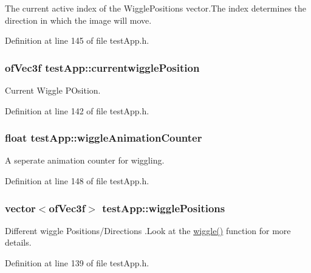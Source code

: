 The current active index of the Wiggle\-Positions vector.\-The index determines the direction in which the image will move. 



Definition at line 145 of file test\-App.\-h.

\hypertarget{group___wiggle_gaf81358868ae15faab1974ec074b1509f}{
\subsubsection[{currentwiggle\-Position}]{\setlength{\rightskip}{0pt plus 5cm}of\-Vec3f test\-App\-::currentwiggle\-Position}}\label{group___wiggle_gaf81358868ae15faab1974ec074b1509f}


Current Wiggle P\-Osition. 



Definition at line 142 of file test\-App.\-h.

\hypertarget{group___wiggle_ga6073b33be7847d675ec089a1d514c506}{
\subsubsection[{wiggle\-Animation\-Counter}]{\setlength{\rightskip}{0pt plus 5cm}float test\-App\-::wiggle\-Animation\-Counter}}\label{group___wiggle_ga6073b33be7847d675ec089a1d514c506}


A seperate animation counter for wiggling. 



Definition at line 148 of file test\-App.\-h.

\hypertarget{group___wiggle_ga5495d37f44bb3e3b00a04ad5910e0a6b}{
\subsubsection[{wiggle\-Positions}]{\setlength{\rightskip}{0pt plus 5cm}vector$<$of\-Vec3f$>$ test\-App\-::wiggle\-Positions}}\label{group___wiggle_ga5495d37f44bb3e3b00a04ad5910e0a6b}


Different wiggle Positions/\-Directions .Look at the \hyperlink{group___wiggle_gacd718eb54b9dc2b45e463414c24de6b9}{wiggle()} function for more details. 



Definition at line 139 of file test\-App.\-h.

